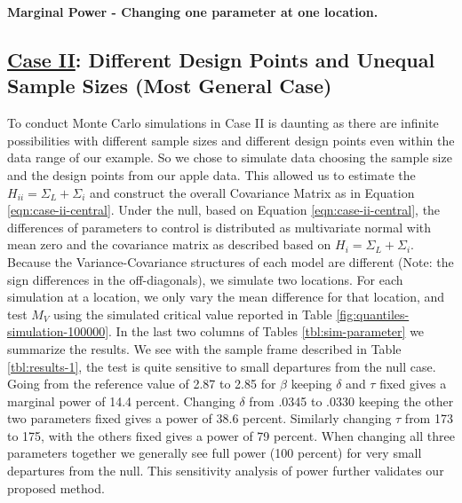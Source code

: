 \documentclass[useAMS]{cJAS2e}
\begin{document}
\newpage
\begin{landscape}
	\begin{table}[h!]
	  \begin{center}
	     \scalebox{0.60}{	 }
	  \end{center}
		\caption{\textbf{Marginal Power - Changing one parameter at one location.}}
		\label{tbl:sim-parameter}
	\end{table}
\end{landscape}

\subsection*{\underline{Case II}: Different Design Points and Unequal Sample Sizes (Most General Case)}
To conduct Monte Carlo simulations in Case II is daunting as there are infinite possibilities with different sample sizes and different design points even within the data range of our example.  So we chose to simulate data choosing the sample size and the design points from our apple data.  This allowed us to estimate the $H_{ii}=\Sigma_L+\Sigma_i$ and construct the overall Covariance Matrix as in Equation \eqref{eqn:case-ii-central}.  Under the null, based on Equation \eqref{eqn:case-ii-central}, the differences of parameters to control is distributed as multivariate normal with mean zero and the covariance matrix as described based on $H_i=\Sigma_L+\Sigma_i$.  Because the Variance-Covariance structures of each model are different (Note:  the sign differences in the off-diagonals), we simulate two locations.  For each simulation at a location, we only vary the mean difference for that location, and test $M_V$ using the simulated critical value reported in Table \ref{fig:quantiles-simulation-100000}.  In the last two columns of Tables \ref{tbl:sim-parameter} we summarize the results.  We see with the sample frame described in Table \ref{tbl:results-1}, the test is quite sensitive to small departures from the null case.  Going from the reference value of 2.87 to 2.85 for $\beta$ keeping  $\delta$ and $\tau$ fixed gives a marginal power of 14.4 percent.  Changing $\delta$ from .0345 to .0330 keeping the other two parameters fixed gives a power of 38.6 percent.  Similarly changing $\tau$ from 173 to 175, with the others fixed gives a power of 79 percent.  When changing all three parameters together we generally see full power (100 percent) for very small departures from the null.  This sensitivity analysis of power further validates our proposed method.
\end{document}
